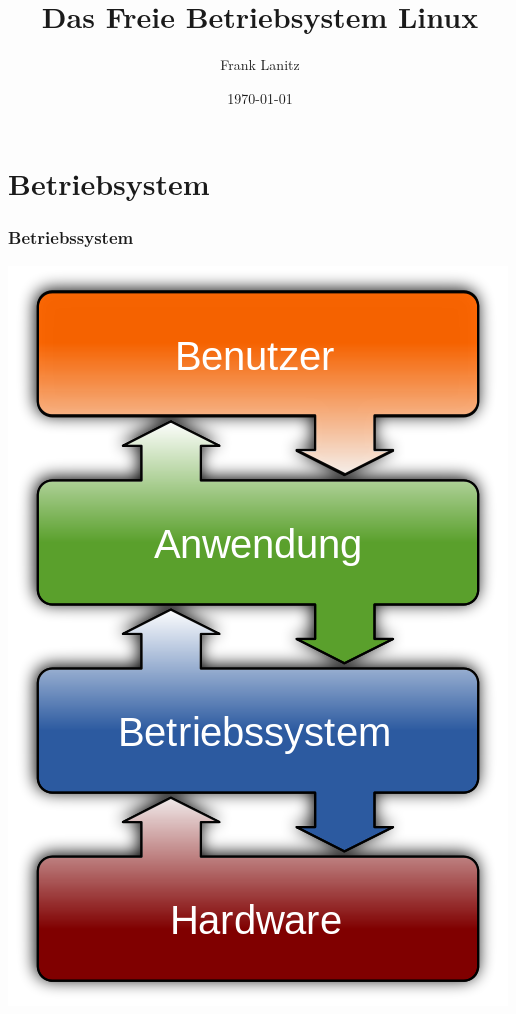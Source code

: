 \documentclass[compress]{beamer}
\title{Das Freie Betriebsystem Linux}
\author{Frank Lanitz}
\date{\today}
\begin{document}
\begin{frame}
	\tableofcontents{}
\end{frame}
\section{Betriebsystem}
\begin{frame}
	\frametitle{Betriebssystem}
	\begin{center}
	\includegraphics[scale=0.25]{media/500px-Operating_system_placement-de.png}
	\end{center}
\end{frame}
\end{document}
